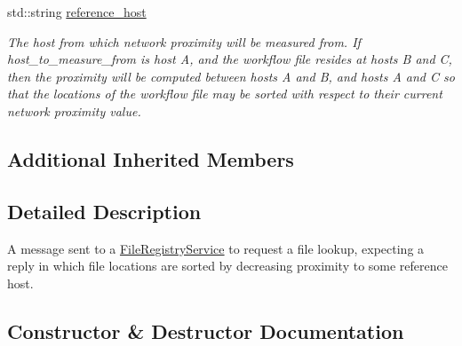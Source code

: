\begin{DoxyCompactItemize}
std\+::string \hyperlink{classwrench_1_1_file_registry_file_lookup_by_proximity_request_message_add8ecc8a1fb81d2a6047ee4b57b415b7}{reference\+\_\+host}
\begin{DoxyCompactList}\small\item\em The host from which network proximity will be measured from. If \textquotesingle{}host\+\_\+to\+\_\+measure\+\_\+from\textquotesingle{} is host \textquotesingle{}A\textquotesingle{}, and the workflow file resides at hosts \textquotesingle{}B\textquotesingle{} and \textquotesingle{}C\textquotesingle{}, then the proximity will be computed between hosts \textquotesingle{}A\textquotesingle{} and \textquotesingle{}B\textquotesingle{}, and hosts \textquotesingle{}A\textquotesingle{} and \textquotesingle{}C\textquotesingle{} so that the locations of the workflow file may be sorted with respect to their current network proximity value. \end{DoxyCompactList}\end{DoxyCompactItemize}
\subsection*{Additional Inherited Members}


\subsection{Detailed Description}
A message sent to a \hyperlink{classwrench_1_1_file_registry_service}{File\+Registry\+Service} to request a file lookup, expecting a reply in which file locations are sorted by decreasing proximity to some reference host. 

\subsection{Constructor \& Destructor Documentation}
\mbox{\label{classwrench_1_1_file_registry_file_lookup_by_proximity_request_message_afbfff2b7190bad627e860907f18c5851}} 
